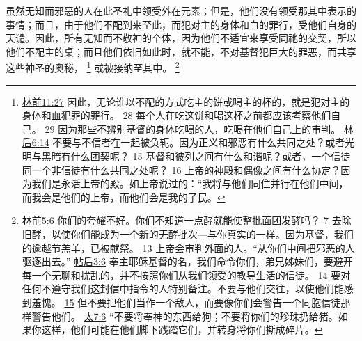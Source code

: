 \documentclass[12pt, a4paper, oneside]{ctexart}
\newcounter{parnum}[section]
\newcommand{\N}{%
   \noindent\refstepcounter{parnum}%
    \makebox[\parindent][l]{\textbf{\arabic{parnum}.}}}
\begin{document}
\N 虽然无知而邪恶的人在此圣礼中领受外在元素；但是，他们没有领受那其中表示的事情；而且，由于他们不配到来至此，而犯对主的身体和血的罪行，受他们自身的天谴。因此，所有无知而不敬神的个体，因为他们不适宜来享受同祂的交契，所以他们不配主的桌；而且他们依旧如此时，就不能，不对基督犯巨大的罪恶，而共享这些神圣的奥秘，
	\footnote {
		\href{https://biblehub.com/1_corinthians/11-27.htm}{林前11:27} 因此，无论谁以不配的方式吃主的饼或喝主的杯的，就是犯对主的身体和血犯罪的罪行。
		\href{https://biblehub.com/1_corinthians/11-28.htm}{28} 每个人在吃这饼和喝这杯之前都应该考察他们自己。
		\href{https://biblehub.com/1_corinthians/11-29.htm}{29} 因为那些不辨别基督的身体吃喝的人，吃喝在他们自己上的审判。
		\href{https://biblehub.com/2_corinthians/6-14.htm}{林后6:14} 不要与不信者在一起被负轭。因为正义和邪恶有什么共同之处？或者光明与黑暗有什么团契呢？
		\href{https://biblehub.com/2_corinthians/6-15.htm}{15} 基督和彼列之间有什么和谐呢？或者，一个信徒同一个非信徒有什么共同之处呢？
		\href{https://biblehub.com/2_corinthians/6-16.htm}{16} 上帝的神殿和偶像之间有什么协定？因为我们是永活上帝的殿。如上帝说过的：“我将与他们同住并行在他们中间，而我会是他们的上帝，而他们会是我的子民。
	}
	或被接纳至其中。
	\footnote {
		\href{https://biblehub.com/1_corinthians/5-6.htm}{林前5:6} 你们的夸耀不好。你们不知道一点酵就能使整批面团发酵吗？
		\href{https://biblehub.com/1_corinthians/5-7.htm}{7} 去除旧酵，以使你们能成为一个新的无酵批次---与你真实的一样。因为基督，我们的逾越节羔羊，已被献祭。
		\href{https://biblehub.com/1_corinthians/5-13.htm}{13} 上帝会审判外面的人。“从你们中间把邪恶的人驱逐出去。”
		\href{https://biblehub.com/2_thessalonians/3-6.htm}{帖后3:6} 奉主耶稣基督的名，我们命令你们，弟兄姊妹们，要避开每一个无聊和扰乱的，并不按照你们从我们领受的教导生活的信徒。
		\href{https://biblehub.com/2_thessalonians/3-14.htm}{14} 要对任何不遵守我们这封信中指令的人特别备注。不要与他们交往，以使他们能感到羞愧。
		\href{https://biblehub.com/2_thessalonians/3-15.htm}{15} 但不要把他们当作一个敌人，而要像你们会警告一个同胞信徒那样警告他们。
		\href{https://biblehub.com/matthew/7-6.htm}{太7:6} “不要将奉神的东西给狗；不要将你们的珍珠扔给猪。如果你这样，他们可能在他们脚下践踏它们，并转身将你们撕成碎片。
	}
\end{document}
